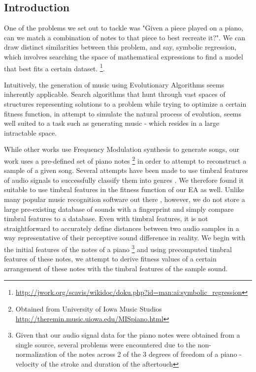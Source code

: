 \documentclass{pnastwo}
\begin{document}
\begin{article}
\section{Introduction}
One of the problems we set out to tackle was "Given a piece played on a piano, can we match a combination of notes to that piece to best recreate it?". We can draw distinct similarities between this problem, and say, symbolic regression, which involves searching the space of mathematical expressions to find a model that best fits a certain dataset. \footnote{\url{http://jwork.org/scavis/wikidoc/doku.php?id=man:ai:symbolic_regression}}. 

Intuitively, the generation of music using Evolutionary Algorithms seems inherently applicable. Search algorithms that hunt through vast spaces of structures representing solutions to a problem while trying to optimize a certain fitness function, in attempt to simulate the natural process of evolution, seems well suited to a task such as generating music - which resides in a large intractable space. 

While other works \cite{lai} \cite{garcia} use Frequency Modulation synthesis to generate songs, our work uses a pre-defined set of piano notes \footnote{Obtained from University of Iowa Music Studios \url{http://theremin.music.uiowa.edu/MISpiano.html}} in order to attempt to reconstruct a sample of a given song. Several attempts have been made to use timbral features of audio signals to successfully classify them into genres \cite{germ} \cite{gtzan}. We therefore found it suitable to use timbral features in the fitness function of our EA as well. Unlike many popular music recognition software out there  \cite{wang}, however, we do not store a large pre-existing database of sounds with a fingerprint and simply compare timbral features to a database. Even with timbral features, it is not straightforward to accurately define distances between two audio samples in a way representative of their perceptive sound difference in reality. We begin with the initial features of the notes of a piano \footnote{Given that our audio signal data for the piano notes were obtained from a single source, several problems were encountered due to the non-normalization of the notes across 2 of the 3 degrees of freedom of a piano - velocity of the stroke and duration of the aftertouch} and using precomputed timbral features of these notes, we attempt to derive fitness values of a certain arrangement of these notes with the timbral features of the sample sound. 


\end{article}
\end{document}
